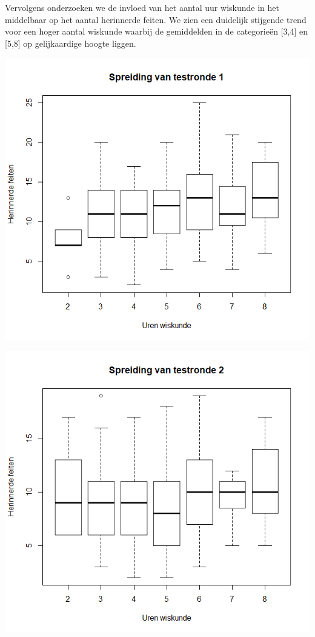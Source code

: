\documentclass{hogent-article}
\begin{document}
	Vervolgens onderzoeken we de invloed van het aantal uur wiskunde in het middelbaar op het aantal herinnerde feiten. We zien een duidelijk stijgende trend voor een hoger aantal wiskunde waarbij de gemiddelden in de categorieën [3,4] en [5,8] op gelijkaardige hoogte liggen.
	
	\begin{minipage}[b]{2.8in}
		\centering
		\includegraphics[width=\linewidth]{img/boxplot1.png}
	\end{minipage}

	\begin{minipage}[b]{2.8in}
		\centering
		\includegraphics[width=\linewidth]{img/boxplot2.png}
	\end{minipage}
	
\end{document}
